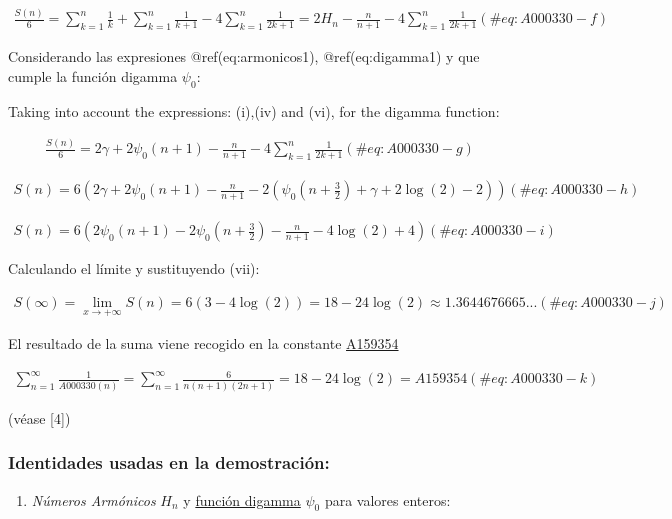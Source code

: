 \documentclass[
  letterpaper,
  DIV=11,
  numbers=noendperiod]{scrreprt}
\providecommand{\tightlist}{%
  \setlength{\itemsep}{0pt}\setlength{\parskip}{0pt}}\usepackage{longtable,booktabs,array}
\begin{document}
\begin{multline}
\displaystyle \frac{S(n)}{6}= \sum_{k=1}^{n} {\frac{1}{k}}+\sum_{k=1}^{n}{\frac{1}{k+1}}-4\sum_{k=1}^{n}{\frac{1}{2k+1}}
= 2H_{n}-\frac{n}{n+1}-4\sum_{k=1}^{n}{\frac{1}{2k+1}}
 (\#eq:A000330-f)
\end{multline}

Considerando las expresiones @ref(eq:armonicos1), @ref(eq:digamma1) y
que cumple la función digamma \(\psi_{0}\):

Taking into account the expressions: (i),(iv) and (vi), for the digamma
function:

\begin{multline}
\frac{S(n)}{6} = 2\gamma + 2\psi_{0}(n+1) - \frac{n}{n+1}
- 4\sum_{k=1}^{n}{\frac{1}{2k+1}}
 (\#eq:A000330-g)
\end{multline}

\begin{multline}
S(n) = 6(2\gamma+2\psi_{0}(n+1) -\frac{n}{n+1}-2(\psi_{0}(n+\frac{3}{2})+\gamma+2\log(2)-2))
 (\#eq:A000330-h)
\end{multline}

\begin{multline}
S(n)=6(2\psi_{0}(n+1)-2\psi_{0}(n+\frac{3}{2})-\frac{n}{n+1} -4\log(2)+4)
 (\#eq:A000330-i)
\end{multline}

Calculando el límite y sustituyendo (vii):

\begin{multline}
S(\infty)= \lim_{x \to{+}\infty}{S(n)}= 6(3-4\log(2))
= 18-24\log(2)\approx 1.3644676665...
 (\#eq:A000330-j)
\end{multline}

El resultado de la suma viene recogido en la constante
\href{https://oeis.org/A159354}{A159354}

\begin{multline}
   \sum_{n=1}^{\infty}{\frac{1}{A000330(n)}} = \sum_{n=1}^{\infty}{\frac{6}{n(n+1)(2n+1)}} =
   18-24\log(2) =
   A159354
  (\#eq:A000330-k)
\end{multline}

(véase {[}4{]})

\hypertarget{identidades-usadas-en-la-demostraciuxf3n}{%
\subsubsection{Identidades usadas en la
demostración:}\label{identidades-usadas-en-la-demostraciuxf3n}}

\begin{enumerate}
\def\labelenumi{(\roman{enumi})}
\tightlist
\item
  \emph{Números Armónicos} \(H_{n}\) y
  \href{https://mathworld.wolfram.com/DigammaFunction.html}{función
  digamma} \(\psi_{0}\) para valores enteros:
\end{enumerate}
\end{document}
